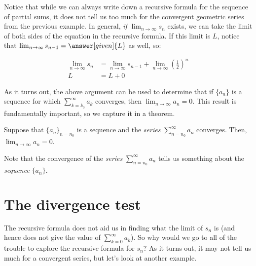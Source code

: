 \documentclass{ximera}
\begin{document}
Notice that while we can always write down a recursive formula for the sequence of partial sums, it does not tell us too much for the convergent geometric series from the previous example. In general, \emph{if} $\lim_{n \to \infty} s_n$ exists, we can take the limit of both sides of the equation in the recursive formula.  If this limit is $L$, notice that $\lim_{n \to \infty} s_{n-1} = \answer[given]{L}$ as well, so:

\begin{align*}
\lim_{n \to \infty} s_n &= \lim_{n \to \infty} s_{n-1} +\lim_{n \to \infty} \left(\frac{1}{2}\right)^n \\
L &= L + 0 
\end{align*}



As it turns out, the above argument can be used to determine that if $\{a_n\}$ is a sequence for which $\sum_{k=k_0}^{\infty} a_k$ converges, then $\lim_{n \to \infty} a_n =0$.  This result is fundamentally important, so we capture it in a theorem.

\begin{theorem}
Suppose that $\{a_n\}_{n=n_0}$ is a sequence and the \emph{series} $\sum_{n=n_0}^{\infty} a_n$ converges.  Then, $\lim_{n \to \infty} a_n =0$.   
\end{theorem}

\begin{remark}
Note that the convergence of the \emph{series} $\sum_{n=n_0}^{\infty} a_n$ tells us something about the \emph{sequence} $\{a_n\}$.
\end{remark}

\section{The divergence test}
The recursive formula does not aid us in finding what the limit of $s_n$ is (and hence does not give the value of $\sum_{k=0}^{\infty} a_k$).  So why would we go to all of the trouble to explore the recursive formula for $s_n$?  As it turns out, it may not tell us much for a convergent series, but let's look at another example.
\end{document}
